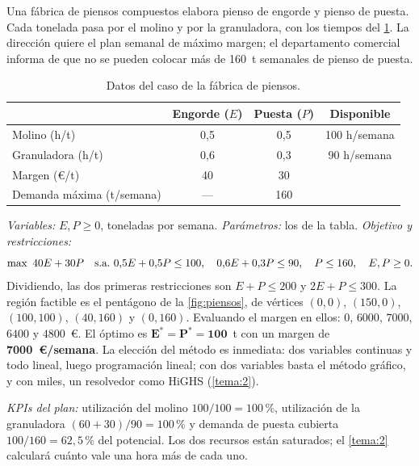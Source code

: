 \begin{ejemplo}\label{ej:piensos}
Una fábrica de piensos compuestos elabora pienso de engorde y pienso de puesta. Cada tonelada pasa por el molino y por la granuladora, con los tiempos del \cref{tab:piensos}. La dirección quiere el plan semanal de máximo margen; el departamento comercial informa de que no se pueden colocar más de 160~t semanales de pienso de puesta.

\begin{table}[h]
\centering\small
\caption{Datos del caso de la fábrica de piensos.}\label{tab:piensos}
\begin{tabular}{@{}lccc@{}}
\toprule
 & Engorde ($E$) & Puesta ($P$) & Disponible \\
\midrule
Molino (h/t) & 0,5 & 0,5 & 100 h/semana \\
Granuladora (h/t) & 0,6 & 0,3 & 90 h/semana \\
Margen (€/t) & 40 & 30 & \\
Demanda máxima (t/semana) & --- & 160 & \\
\bottomrule
\end{tabular}
\end{table}

\emph{Variables:} $E,P\ge 0$, toneladas por semana. \emph{Parámetros:} los de la tabla. \emph{Objetivo y restricciones:}
\[
\max\ 40E+30P\quad\text{s.a.}\  0{,}5E+0{,}5P\le 100,\quad 0{,}6E+0{,}3P\le 90,\quad P\le 160,\quad E,P\ge 0.
\]
Dividiendo, las dos primeras restricciones son $E+P\le 200$ y $2E+P\le 300$. La región factible es el pentágono de la \cref{fig:piensos}, de vértices $(0,0)$, $(150,0)$, $(100,100)$, $(40,160)$ y $(0,160)$. Evaluando el margen en ellos: $0$, $6000$, $7000$, $6400$ y $4800$~€. El óptimo es $\bm{E^{*}=P^{*}=100}$~t con un margen de \textbf{7000~€/semana}. La elección del método es inmediata: dos variables continuas y todo lineal, luego programación lineal; con dos variables basta el método gráfico, y con miles, un resolvedor como HiGHS (\cref{tema:2}).

\emph{KPIs del plan:} utilización del molino $100/100=100\,\%$, utilización de la granuladora $(60+30)/90=100\,\%$ y demanda de puesta cubierta $100/160=62{,}5\,\%$ del potencial. Los dos recursos están saturados; el \cref{tema:2} calculará cuánto vale una hora más de cada uno.
\end{ejemplo}

